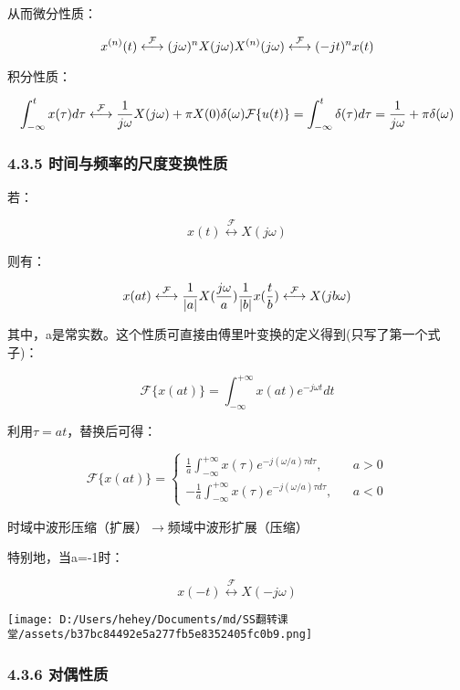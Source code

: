 \documentclass[
]{article}
\begin{document}
从而微分性质：

\[x^{(n)}(t)\stackrel{\mathcal{F}}{\longleftrightarrow}(j\omega)^nX(j\omega)\\
X^{(n)}(j\omega)\stackrel{\mathcal{F}}{\longleftrightarrow}(-jt)^nx(t)\]

积分性质：

\[\int_{-\infty}^tx(\tau)d\tau\stackrel{\mathcal{F}}{\longleftrightarrow}\frac{1}{j\omega}X(j\omega)+\pi X(0)\delta (\omega)\\
\mathcal F\{u(t)\}=\int_{-\infty}^t\delta(\tau)d\tau = \frac{1}{j\omega}+\pi\delta(\omega)\]

\subsubsection{4.3.5
时间与频率的尺度变换性质}\label{435-ux65f6ux95f4ux4e0eux9891ux7387ux7684ux5c3aux5ea6ux53d8ux6362ux6027ux8d28}

若：

\[x(t)\stackrel{\mathcal{F}}{\longleftrightarrow}X(j\omega)\]

则有：

\[x(at)\stackrel{\mathcal{F}}{\longleftrightarrow}\frac{1}{|a|}X(\frac{j\omega}{a})\\
\frac{1}{|b|}x(\frac{t}{b})\stackrel{\mathcal{F}}{\longleftrightarrow}X(jb\omega)\]

其中，a是常实数。这个性质可直接由傅里叶变换的定义得到(只写了第一个式子)：

\[\mathcal F\{x(at)\}=\int_{-\infty}^{+\infty}x(at)e^{-j\omega t}dt\]

利用\(\tau=at\)，替换后可得：

\[\mathcal F\{x(at)\}=
\left\{
\begin{aligned}
    \frac{1}{a}\int_{-\infty}^{+\infty}x(\tau)e^{-j(\omega/a)\tau d\tau} ,  && a>0\\
    -\frac{1}{a}\int_{-\infty}^{+\infty}x(\tau)e^{-j(\omega/a)\tau d\tau}, &&a<0
\end{aligned}
\right.\]

时域中波形压缩（扩展）\(\to\)频域中波形扩展（压缩）

特别地，当a=-1时：

\[x(-t)\stackrel{\mathcal{F}}{\longleftrightarrow}X(-j\omega)\]

\texttt{[image: D:/Users/hehey/Documents/md/SS翻转课堂/assets/b37bc84492e5a277fb5e8352405fc0b9.png]}

\subsubsection{4.3.6 对偶性质}\label{436-ux5bf9ux5076ux6027ux8d28}
\end{document}
